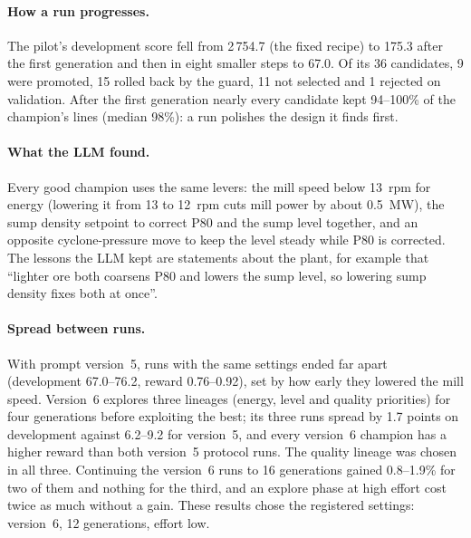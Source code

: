\paragraph{How a run progresses.} The pilot's development score fell from
2\,754.7 (the fixed recipe) to 175.3 after the first generation and then in
eight smaller steps to 67.0. Of its 36
candidates, 9 were promoted, 15 rolled back by the guard, 11 not selected and 1
rejected on validation. After the first generation nearly every candidate kept
94--100\% of the champion's lines (median 98\%): a run polishes the design it
finds first.

\paragraph{What the LLM found.} Every good champion uses the same levers: the
mill speed below 13~rpm for energy (lowering it from 13 to 12~rpm cuts mill
power by about 0.5~MW), the sump density setpoint to correct P80 and the sump
level together, and an opposite cyclone-pressure move to keep the level steady
while P80 is corrected. The lessons the LLM kept are statements about the
plant, for example that ``lighter ore both coarsens P80 and lowers the sump
level, so lowering sump density fixes both at once''.

\paragraph{Spread between runs.} With prompt version~5, runs with the same
settings ended far apart (development 67.0--76.2, reward 0.76--0.92), set by
how early they lowered the mill speed. Version~6 explores three lineages
(energy, level and quality priorities) for four generations before exploiting
the best; its three runs spread by 1.7 points on development against 6.2--9.2
for version~5, and every version~6 champion has a higher reward than both
version~5 protocol runs. The quality lineage was chosen in all three.
Continuing the version~6 runs to 16 generations gained 0.8--1.9\% for two of
them and nothing for the third, and an explore phase at high effort cost twice
as much without a gain. These results chose the registered settings: version~6,
12 generations, effort low.

